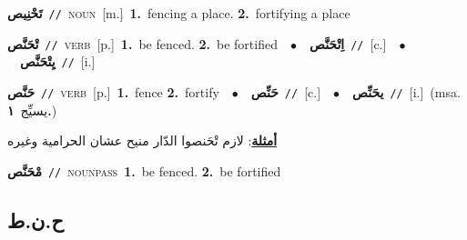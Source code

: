 \documentclass[10pt,a4paper,twoside]{article} %
\begin{document}
\begin{multicols}{2}
{\setlength\topsep{0pt}\textbf{\foreignlanguage{arabic}{تَحْنِيص}}\ {\color{gray}\texttt{//}\color{black}}\ \textsc{noun}\ [m.]\ \textbf{1.}~fencing a place.  \textbf{2.}~fortifying a place\ } \vspace{2mm}

{\setlength\topsep{0pt}\textbf{\foreignlanguage{arabic}{تْحَنَّص}}\ {\color{gray}\texttt{//}\color{black}}\ \textsc{verb}\ [p.]\ \textbf{1.}~be fenced.  \textbf{2.}~be fortified\ \ $\bullet$\ \ \setlength\topsep{0pt}\textbf{\foreignlanguage{arabic}{اِتْحَنَّص}}\ {\color{gray}\texttt{//}\color{black}}\ [c.]\ \ $\bullet$\ \ \setlength\topsep{0pt}\textbf{\foreignlanguage{arabic}{يِتْحَنَّص}}\ {\color{gray}\texttt{//}\color{black}}\ [i.]\ } \vspace{2mm}

{\setlength\topsep{0pt}\textbf{\foreignlanguage{arabic}{حَنَّص}}\ {\color{gray}\texttt{//}\color{black}}\ \textsc{verb}\ [p.]\ \textbf{1.}~fence  \textbf{2.}~fortify\ \ $\bullet$\ \ \setlength\topsep{0pt}\textbf{\foreignlanguage{arabic}{حَنِّص}}\ {\color{gray}\texttt{//}\color{black}}\ [c.]\ \ $\bullet$\ \ \setlength\topsep{0pt}\textbf{\foreignlanguage{arabic}{يحَنِّص}}\ {\color{gray}\texttt{//}\color{black}}\ [i.]\ \color{gray}(msa. \foreignlanguage{arabic}{يسيِّج}~\foreignlanguage{arabic}{\textbf{١.}})\color{black}\  \begin{flushright}\color{gray}\foreignlanguage{arabic}{\textbf{\underline{\foreignlanguage{arabic}{أمثلة}}}: لازم تْحَنصوا الدّار منيح عشان الحرامية وغيره}\end{flushright}\color{black}} \vspace{2mm}

{\setlength\topsep{0pt}\textbf{\foreignlanguage{arabic}{مْحَنَّص}}\ {\color{gray}\texttt{//}\color{black}}\ \textsc{noun\textunderscore pass}\ \textbf{1.}~be fenced.  \textbf{2.}~be fortified\ } \vspace{2mm}

\vspace{-3mm}
\subsection*{\color{blue}\foreignlanguage{arabic}{ح.ن.ط}\color{blue}{}} 


\end{multicols}
\end{document}
